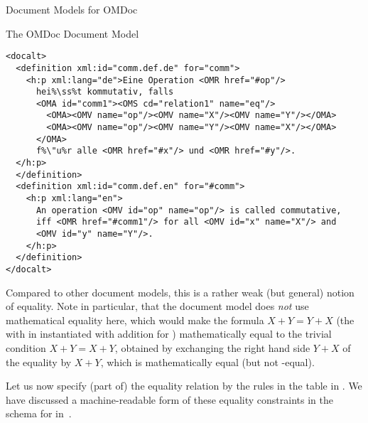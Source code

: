 \begin{module}[id=document-model]
\begin{omgroup}[id=document-model]{Document Models for OMDoc}
\begin{omgroup}[id=omdom]{The OMDoc Document Model}
\begin{module}[id=omdom]
\begin{lstlisting}[escapechar=\%,label=lst:third,
   index={definition,docalt,OMA},
   caption={An {\omdoc}-Equal Representation for {\mylstsref{first}{second}}}]
<docalt>
  <definition xml:id="comm.def.de" for="comm">
    <h:p xml:lang="de">Eine Operation <OMR href="#op"/> 
      hei%\ss%t kommutativ, falls 
      <OMA id="comm1"><OMS cd="relation1" name="eq"/>
        <OMA><OMV name="op"/><OMV name="X"/><OMV name="Y"/></OMA>
        <OMA><OMV name="op"/><OMV name="Y"/><OMV name="X"/></OMA>
      </OMA>
      f%\"u%r alle <OMR href="#x"/> und <OMR href="#y"/>.
  </h:p>
  </definition>
  <definition xml:id="comm.def.en" for="#comm">
    <h:p xml:lang="en">
      An operation <OMV id="op" name="op"/> is called commutative, 
      iff <OMR href="#comm1"/> for all <OMV id="x" name="X"/> and 
      <OMV id="y" name="Y"/>.
    </h:p>
  </definition>
</docalt>
\end{lstlisting}

Compared to other document models, this is a rather weak (but general) notion of
equality. Note in particular, that the {\omdoc} document model does {\emph{not}}
use mathematical equality here, which would make the formula $X+Y=Y+X$ (the
{} with {} in
{} instantiated with addition for {}) mathematically
equal to the trivial condition $X+Y=X+Y$, obtained by exchanging the right hand
side $Y+X$ of the equality by $X+Y$, which is mathematically equal (but not
{\omdoc}-equal).

Let us now specify (part of) the equality relation by the rules in the table in
{}.  We have discussed a machine-readable form of these equality
constraints in the {\xml} schema for {\omdoc} in~\cite{KohAng:tccmvc03}.


\end{module}
\end{omgroup}
\end{omgroup}
\end{module}
